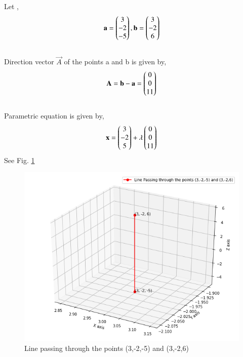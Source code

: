 Let , 
\begin{align}\mathbf{a}=\begin{pmatrix}
3\\
-2\\
-5
\end{pmatrix}
,\mathbf{b} = \begin{pmatrix}
3\\
-2\\
6
\end{pmatrix}
\end{align}
\\
Direction vector $\vec{A}$ of the points a and b is given by,
\begin{align}
\mathbf{A} = \mathbf{b}-\mathbf{a} = \begin{pmatrix}
0\\
0\\
11
\end{pmatrix}
\end{align}
\\
Parametric equation is given by,
\\
\begin{align}
\mathbf{x}
=\begin{pmatrix}
3\\
-2\\
5
\end{pmatrix}+\lambda\begin{pmatrix}
0\\
0\\
11
\end{pmatrix}
\end{align}
See Fig.     \ref{Fig:solutions/line_plane/72/1}

\begin{figure}[h]
    \centering
    \includegraphics[width=\columnwidth]{./solutions/line_plane/72/assign2.png}
    \caption{Line passing through the points (3,-2,-5) and (3,-2,6)}
    \label{Fig:solutions/line_plane/72/1}
\end{figure}

